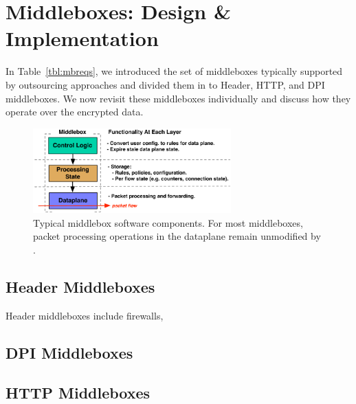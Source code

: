 \section{Middleboxes: Design \& Implementation}
\label{sec:mbs}

In Table~\ref{tbl:mbreqs}, we introduced the set of middleboxes typically supported by outsourcing approaches and divided them in to Header, HTTP, and DPI middleboxes. 
We now revisit these middleboxes individually and discuss how they operate over the encrypted data.

\begin{figure}[t]
  \centering
  \includegraphics[width=3in]{fig/mbarch}
  \caption[]{\label{fig:mbarch} Typical middlebox software components. For most middleboxes, packet processing operations in the dataplane remain unmodified by \sys. }
\end{figure}

\subsection{Header Middleboxes}
Header middleboxes include firewalls,

\subsection{DPI Middleboxes}

\subsection{HTTP Middleboxes}



